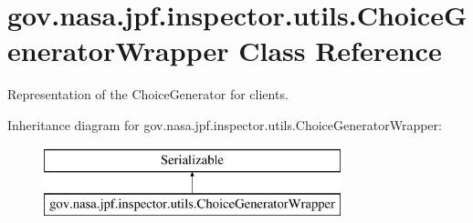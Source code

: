 \hypertarget{classgov_1_1nasa_1_1jpf_1_1inspector_1_1utils_1_1_choice_generator_wrapper}{}\section{gov.\+nasa.\+jpf.\+inspector.\+utils.\+Choice\+Generator\+Wrapper Class Reference}
\label{classgov_1_1nasa_1_1jpf_1_1inspector_1_1utils_1_1_choice_generator_wrapper}


Representation of the Choice\+Generator for clients.  


Inheritance diagram for gov.\+nasa.\+jpf.\+inspector.\+utils.\+Choice\+Generator\+Wrapper\+:\begin{figure}[H]
\begin{center}
\leavevmode
\includegraphics[height=2.000000cm]{classgov_1_1nasa_1_1jpf_1_1inspector_1_1utils_1_1_choice_generator_wrapper}
\end{center}
\end{figure}
